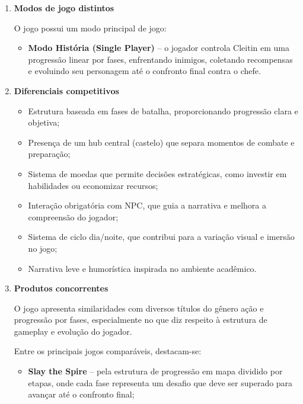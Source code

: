 \documentclass[12pt,a4paper]{article}
\begin{document}
\begin{enumerate}
O objetivo final é completar todas as fases e enfrentar o professor Chaflames na batalha final, recuperando todas as partes do diploma e concluindo a jornada.

\item \textbf{Modos de jogo distintos}

O jogo possui um modo principal de jogo:

\begin{itemize}
\item \textbf{Modo História (Single Player)} – o jogador controla Cleitin em uma progressão linear por fases, enfrentando inimigos, coletando recompensas e evoluindo seu personagem até o confronto final contra o chefe.
\end{itemize}

\item \textbf{Diferenciais competitivos}

\begin{itemize}
\item Estrutura baseada em fases de batalha, proporcionando progressão clara e objetiva;
\item Presença de um hub central (castelo) que separa momentos de combate e preparação;
\item Sistema de moedas que permite decisões estratégicas, como investir em habilidades ou economizar recursos;
\item Interação obrigatória com NPC, que guia a narrativa e melhora a compreensão do jogador;
\item Sistema de ciclo dia/noite, que contribui para a variação visual e imersão no jogo;
\item Narrativa leve e humorística inspirada no ambiente acadêmico.
\end{itemize}

\item \textbf{Produtos concorrentes}

O jogo apresenta similaridades com diversos títulos do gênero ação e progressão por fases, especialmente no que diz respeito à estrutura de gameplay e evolução do jogador.

Entre os principais jogos comparáveis, destacam-se:

\begin{itemize}
\item \textbf{Slay the Spire} – pela estrutura de progressão em mapa dividido por etapas, onde cada fase representa um desafio que deve ser superado para avançar até o confronto final;


\end{itemize}
\end{enumerate}
\end{document}
